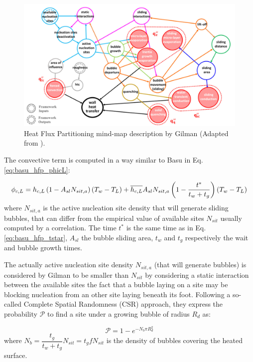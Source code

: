 \begin{figure}[!h]
\centering
\includegraphics[width=0.8\linewidth]{img/HFP/Gilman/mind_map.png}
\caption{Heat Flux Partitioning mind-map description by Gilman \cite{gilman_development_2014} (Adapted from \cite{gilman_self-consistent_2017}).}%
\label{fig:gilman_hfp}
\end{figure}


The convective term is computed in a way similar to Basu \etal \cite{basu_wall_2005} in Eq. \ref{eq:basu_hfp_phicL}:

\begin{equation}
\phi_{c,L} = h_{c,L}\left( 1-A_{sl}N_{sit,a} \right)\left( T_{w}-T_{L} \right) + \overline{h_{c,L}}A_{sl}N_{sit,a}\left( 1 - \frac{t^{*}}{t_{w}+t_{g}} \right)\left( T_{w}-T_{L} \right)
\label{eq:gilman_hfp_phicL}
\end{equation}
where $N_{sit,a}$ is the active nucleation site density that will generate sliding bubbles, that can differ from the empirical value of available sites $N_{sit}$ usually computed by a correlation. The time $t^{*}$ is the same time as in Eq. \ref{eq:basu_hfp_tstar}, $A_{sl}$ the bubble sliding area, $t_{w}$ and $t_{g}$ respectively the wait and bubble growth times.

\npar

The actually active nucleation site density $N_{sit,a}$ (that will generate bubbles) is considered by Gilman to be smaller than $N_{sit}$ by considering a static interaction between the available sites \ie the fact that a bubble laying on a site may be blocking nucleation from an other site laying beneath its foot. Following a so-called Complete Spatial Randomness (CSR) approach, they express the probability $\mathcal{P}$ to find a site under a growing bubble of radius $R_{d}$ as:

\begin{equation}
\mathcal{P} = 1-e^{-N_{b}\pi R_{d}^{2}}
\label{eq:gilman_hfp_pinter}
\end{equation} 
where $N_{b} = \dfrac{t_{g}}{t_{w}+t_{g}}N_{sit} = t_{g} f N_{sit}$ is the density of bubbles covering the heated surface.

